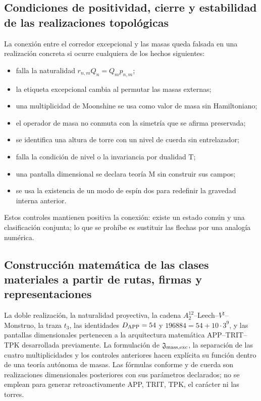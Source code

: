 \subsection{Condiciones de positividad, cierre y estabilidad de las realizaciones topológicas}
La conexión entre el corredor excepcional y las masas queda falsada en una realización concreta si ocurre cualquiera de los hechos siguientes:

\begin{itemize}
\item falla la naturalidad \(r_{n,m}Q_n=Q_mp_{n,m}\);
\item la etiqueta excepcional cambia al permutar las masas externas;
\item una multiplicidad de Moonshine se usa como valor de masa sin Hamiltoniano;
\item el operador de masa no conmuta con la simetría que se afirma preservada;
\item se identifica una altura de torre con un nivel de cuerda sin entrelazador;
\item falla la condición de nivel o la invariancia por dualidad T;
\item una pantalla dimensional se declara teoría M sin construir sus campos;
\item se usa la existencia de un modo de espín dos para redefinir la gravedad
interna anterior.

\end{itemize}
Estos controles mantienen positiva la conexión: existe un estado común y una clasificación conjunta; lo que se prohíbe es sustituir las flechas por una analogía numérica.

\subsection{Construcción matemática de las clases materiales a partir de rutas, firmas y representaciones}
La doble realización, la naturalidad proyectiva, la cadena \(A_2^{12}\)--Leech--\(V^\natural\)--Monstruo, la traza \(t_3\), las identidades \(D_{\rm APP}=54\) y \(196884=54+10\cdot3^9\), y las pantallas dimensionales pertenecen a la arquitectura matemática APP--TRIT--TPK desarrollada previamente. La formulación de \(\mathfrak J_{\rm mass,exc}\), la separación de las cuatro multiplicidades y los controles anteriores hacen explícita su función dentro de una teoría autónoma de masas. Las fórmulas conforme y de cuerda son realizaciones dimensionales posteriores con sus parámetros declarados; no se emplean para generar retroactivamente APP, TRIT, TPK, el carácter ni las torres.
